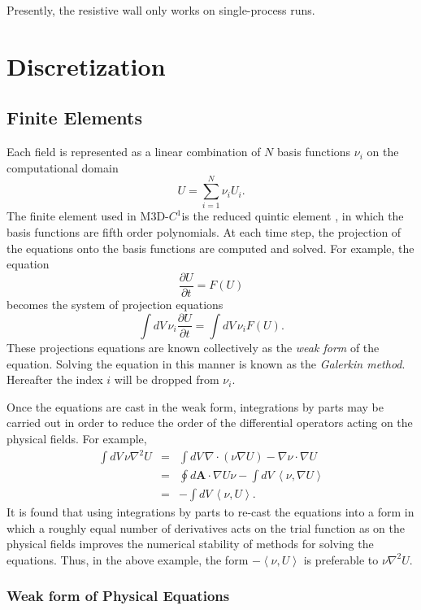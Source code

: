 \documentclass[letterpaper]{book}
\newcommand{\ddt}[1]{\frac{\partial #1}{\partial t}}
\renewcommand{\vec}[1]{\ensuremath{\mathbf{#1}}}
\newcommand{\codename}{\textsc{M3D-$C^1$}}
\newcommand{\grad}[1]{\nabla #1}
\renewcommand{\div}[1]{\nabla \cdot #1}
\newcommand{\ip}[2]{\left\langle  #1,#2\right\rangle}
\begin{document}
Presently, the resistive wall only works on single-process runs.



\chapter{Discretization}

\section{Finite Elements}

Each field is represented as a linear combination of $N$ basis
functions $\nu_i$ on the computational domain
\[ U = \sum_{i=1}^N \nu_i U_i. \]
The finite element used in \codename is the reduced quintic element
\cite{Jardin04}, in which the basis functions are fifth order
polynomials.  At each time step, the projection of the equations onto
the basis functions are computed and solved.  For example, the
equation
\[ \ddt{U} = F(U) \]
becomes the system of projection equations
\[ \int dV\, \nu_i \ddt{U} = \int dV\, \nu_i F(U). \]
These projections equations are known collectively as the \emph{weak
form} of the equation.  Solving the equation in this manner is known
as the \emph{Galerkin method}.  Hereafter the index $i$ will be
dropped from $\nu_i$.

Once the equations are cast in the weak form, integrations by parts
may be carried out in order to reduce the order of the differential
operators acting on the physical fields.  For example, 
\begin{eqnarray*}
  \int dV\, \nu \nabla^2 U 
  & = & \int dV\, \div{(\nu \grad{U})} - \grad{\nu} \cdot \grad{U}\\
  & = & \oint d\vec{A} \cdot \grad{U} \nu - \int dV\, \ip{\nu}{\nabla U}\\
  & = & - \int dV\, \ip{\nu}{U}.
\end{eqnarray*}
It is found that using integrations by parts to re-cast the equations
into a form in which a roughly equal number of derivatives acts on the
trial function as on the physical fields improves the numerical
stability of methods for solving the equations.  Thus, in the above
example, the form $-\ip{\nu}{U}$ is preferable to $\nu \nabla^2
U$.

\subsection{Weak form of Physical Equations}
\end{document}
